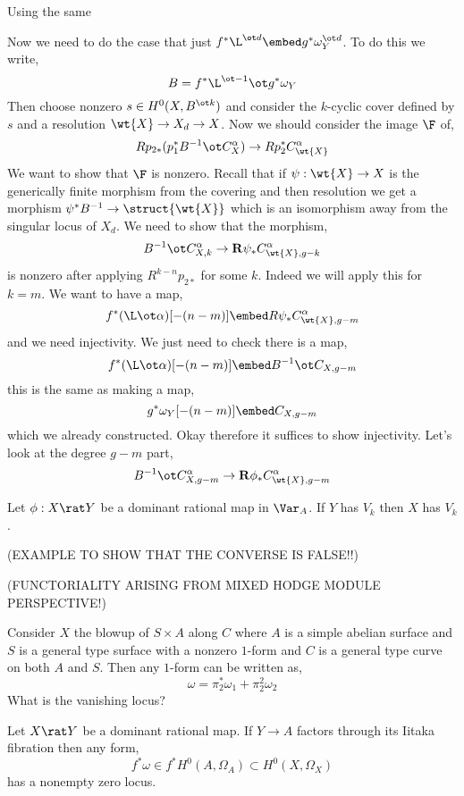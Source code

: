 \documentclass[12pt]{article}
\begin{document}
Using the same 

Now we need to do the case that just $f^* \L^{\ot d} \embed g^* \omega_Y^{\ot d}$. To do this we write,
\[ B = f^* \L^{\ot -1} \ot g^* \omega_Y \]
Then choose nonzero $s \in H^0(X, B^{\ot k})$ and consider the $k$-cyclic cover defined by $s$ and a resolution $\wt{X} \to X_d \to X$. Now we should consider the image $\F$ of,
\[ R p_{2*} (p_1^* B^{-1} \ot C_X^\alpha) \to R p_2^* C^\alpha_{\wt{X}} \]
We want to show that $\F$ is nonzero. Recall that if $\psi : \wt{X} \to X$ is the generically finite morphism from the covering and then resolution we get a morphism $\psi^{*} B^{-1} \to \struct{\wt{X}}$ which is an isomorphism away from the singular locus of $X_d$. We need to show that the morphism,
\[ B^{-1} \ot C_{X, k}^\alpha \to \R \psi_* C^\alpha_{\wt{X}, g-k} \]
is nonzero after applying $R^{k-n} p_{2*}$ for some $k$. Indeed we will apply this for $k = m$. We want to have a map,
\[ f^* (\L \ot \alpha)[-(n-m)] \embed R \psi_* C^\alpha_{\wt{X}, g-m} \]
and we need injectivity. We just need to check there is a map,
\[ f^* (\L \ot \alpha)[-(n-m)] \embed B^{-1} \ot C_{X, g-m} \]
this is the same as making a map,
\[ g^* \omega_Y [-(n-m)] \embed C_{X, g-m} \]
which we already constructed. Okay therefore it suffices to show injectivity. Let's look at the degree $g-m$ part,
\[ B^{-1} \ot C_{X, g-m}^\alpha \to \R \phi_* C^\alpha_{\wt{X}, g-m} \]



\begin{prop} \label{prop:rational_map_functoriality}
Let $\phi : X \rat Y$ be a dominant rational map in $\Var_A$. If $Y$ has $V_k$ then $X$ has $V_k$. 
\end{prop}

(EXAMPLE TO SHOW THAT THE CONVERSE IS FALSE!!)

(FUNCTORIALITY ARISING FROM MIXED HODGE MODULE PERSPECTIVE!)

\begin{example}
Consider $X$ the blowup of $S \times A$ along $C$ where $A$ is a simple abelian surface and $S$ is a general type surface with a nonzero $1$-form and $C$ is a general type curve on both $A$ and $S$. Then any $1$-form can be written as,
\[ \omega = \pi_2^* \omega_1 + \pi_2^2 \omega_2 \]
What is the vanishing locus?
\end{example}


\begin{cor} \label{cor:rational_and_Iitaka}
Let $X \rat Y$ be a dominant rational map. If $Y \to A$ factors through its Iitaka fibration then any form,
\[ f^* \omega \in f^* H^0(A, \Omega_A) \subset H^0(X, \Omega_X) \]
has a nonempty zero locus.  
\end{cor}
\end{document}
